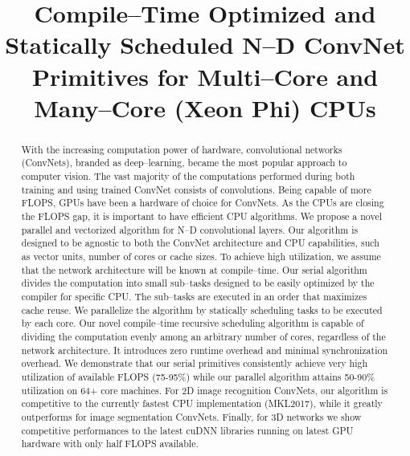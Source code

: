 \documentclass[10pt, conference, compsocconf]{./IEEEtran/IEEEtran}
\begin{document}
\setlength{\pdfpageheight}{\paperheight}
\setlength{\pdfpagewidth}{\paperwidth}

\title{Compile--Time Optimized and Statically Scheduled N--D ConvNet
  Primitives for Multi--Core and Many--Core (Xeon Phi) CPUs }


\author{ } \maketitle



\begin{abstract}

  With the increasing computation power of hardware, convolutional
  networks (ConvNets), branded as deep--learning, became the most
  popular approach to computer vision.  The vast majority of the
  computations performed during both training and using trained
  ConvNet consists of convolutions.  Being capable of more FLOPS, GPUs
  have been a hardware of choice for ConvNets.  As the CPUs are
  closing the FLOPS gap, it is important to have efficient CPU
  algorithms.  We propose a novel parallel and vectorized algorithm
  for N--D convolutional layers.  Our algorithm is designed to be
  agnostic to both the ConvNet architecture and CPU capabilities, such
  as vector units, number of cores or cache sizes.  To achieve high
  utilization, we assume that the network architecture will be known
  at compile--time.  Our serial algorithm divides the computation into
  small sub--tasks designed to be easily optimized by the compiler for
  specific CPU.  The sub--tasks are executed in an order that
  maximizes cache reuse.  We parallelize the algorithm by statically
  scheduling tasks to be executed by each core.  Our novel
  compile--time recursive scheduling algorithm is capable of dividing
  the computation evenly among an arbitrary number of cores,
  regardless of the network architecture.  It introduces zero runtime
  overhead and minimal synchronization overhead.  We demonstrate that
  our serial primitives consistently achieve very high utilization of
  available FLOPS (75-95\%) while our parallel algorithm attains
  50-90\% utilization on 64+ core machines.  For 2D image recognition
  ConvNets, our algorithm is competitive to the currently fastest CPU
  implementation (MKL2017), while it greatly outperforms for image
  segmentation ConvNets.  Finally, for 3D networks we show competitive
  performances to the latest cuDNN libraries running on latest GPU
  hardware with only half FLOPS available.

\end{abstract}
\setlength{\belowcaptionskip}{-15pt}










%

{\small


}
\end{document}
